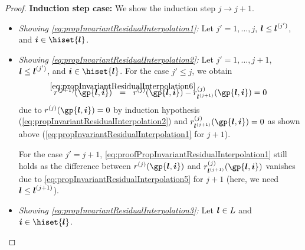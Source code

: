 \begin{proof}
  \noindent
  \textbf{Induction step case:}
  We show the induction step $j \to j + 1$.
  \begin{itemize}
    \item
    \emph{Showing \eqref{eq:propInvariantResidualInterpolation1}:}
    Let $j' = 1, \dotsc, j$, ${\boldsymbol{l}} \le {\boldsymbol{l}}^{(j')}$,
    and $\*i \in \hiset{\*l}$.
    
    \item
    \emph{Showing \eqref{eq:propInvariantResidualInterpolation2}:}
    Let $j' = 1, \dotsc, j + 1$, ${\boldsymbol{l}} \le {\boldsymbol{l}}^{(j')}$,
    and $\*i \in \hiset{\*l}$.
    For the case $j' \le j$, we obtain
    \begin{equation}
      \label{eq:proofPropInvariantResidualInterpolation1}
      r^{(j+1)}(\gp{\*l,\*i})
      \eqwithref{6}
      r^{(j)}(\gp{\*l,\*i}) - r_{\*l^{(j+1)}}^{(j)}(\gp{\*l,\*i})
      = 0
    \end{equation}
    due to $r^{(j)}(\gp{\*l,\*i}) = 0$ by induction hypothesis
    (\cref{eq:propInvariantResidualInterpolation2}) and
    $r_{\*l^{(j+1)}}^{(j)}(\gp{\*l,\*i}) = 0$ as shown above
    (\cref{eq:propInvariantResidualInterpolation1} for $j + 1$).
    
    For the case $j' = j + 1$,
    \cref{eq:proofPropInvariantResidualInterpolation1}
    still holds as the difference between
    $r^{(j)}(\gp{\*l,\*i})$ and $r_{\*l^{(j+1)}}^{(j)}(\gp{\*l,\*i})$
    vanishes due to \eqref{eq:propInvariantResidualInterpolation5}
    for $j + 1$
    (here, we need ${\boldsymbol{l}} \le {\boldsymbol{l}}^{(j+1)}$).
    
    \item
    \emph{Showing \eqref{eq:propInvariantResidualInterpolation3}:}
    Let ${\boldsymbol{l}} \in L$ and $\*i \in \hiset{\*l}$.
  \end{itemize}
\end{proof}
